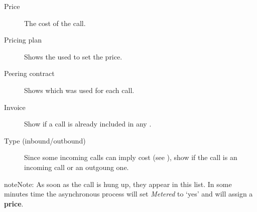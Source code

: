\documentclass[letterpaper,10pt,english]{sphinxmanual}
\begin{document}
\begin{description}
\item[{Price}] \leavevmode{}\label{billing_and_invoices/billable_calls:term-price}
The cost of the call.

\item[{Pricing plan}] \leavevmode{}\label{billing_and_invoices/billable_calls:term-pricing-plan}
Shows the {\hyperref[external_outgoing_calls/noplan_nocall:price\string-plan]{}} used to set the price.

\item[{Peering contract}] \leavevmode{}\label{billing_and_invoices/billable_calls:term-peering-contract}
Shows which {\hyperref[external_incoming_calls/peering_contracts:peering\string-contracts]{}} was used for
each call.

\item[{Invoice}] \leavevmode{}\label{billing_and_invoices/billable_calls:term-invoice}
Show if a call is already included in any {\hyperref[billing_and_invoices/invoices:invoices]{}}.

\item[{Type (inbound/outbound)}] \leavevmode{}\label{billing_and_invoices/billable_calls:term-type-inbound-outbound}
Since some incoming calls can imply cost (see
{\hyperref[external_incoming_calls/configure_ddi:bill\string-inbound]{}}), show if the call is an
incoming call or an outgoung one.

\end{description}

\begin{notice}{note}{Note:}
As soon as the call is hung up, they appear in this list. In some minutes
time the asynchronous process will set \emph{Metered} to `yes' and will assign a
\textbf{price}.
\end{notice}
\end{document}

